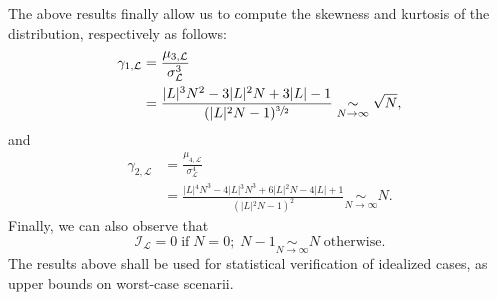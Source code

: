 The above results finally allow us to compute the skewness and
kurtosis of the distribution, respectively as follows:
\begin{align*}
\gamma_{1,\mathcal{L}}
&= \frac{\mu_{3,\mathcal{L}}}{\sigma_{\mathcal{L}}^3}\\
&= \frac{\vert{L}\vert{}^3N^2-3\vert{L}\vert{}^2N+3\vert{L}\vert{}-1}
{(\vert{L}\vert{}^2N-1)^{\sfrac{3}{2}}}
\underset{N\to\infty}{\sim}\sqrt{N},
\end{align*}
and
\begin{align*}
\gamma_{2,\mathcal{L}}
&= \frac{\mu_{4,\mathcal{L}}}{\sigma_{\mathcal{L}}^4}\\
&= \frac{\vert{L}\vert{}^4N^3 - 4\vert{L}\vert{}^3N^3
+ 6\vert{L}\vert{}^2N - 4\vert{L}\vert{} + 1}
{(\vert{L}\vert{}^2N-1)^2}
\underset{N\to\infty}{\sim}N.
\end{align*}
Finally, we can also observe that
\[
\mathcal{I}_{\mathcal{L}}
= 0 \;\mathrm{if}\;N=0;\;N-1\underset{N\to\infty}{\sim}N\;\mathrm{otherwise}.
\]
The results above shall be used for statistical verification of
idealized cases, as upper bounds on worst-case scenarii.

